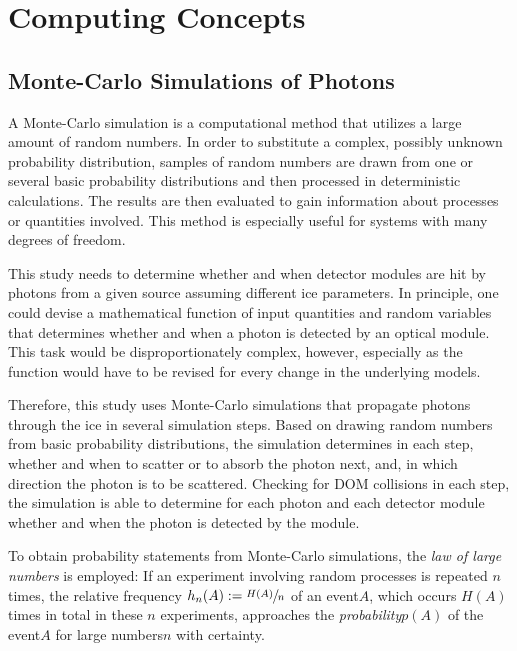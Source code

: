 
\section{Computing Concepts}
\label{sec:simulation_background}

\subsection{Monte-Carlo Simulations of Photons}
\label{sec:monte_carlo}


A Monte-Carlo simulation is a computational method that utilizes a large amount of random numbers.
In order to substitute a complex, possibly unknown probability distribution, samples of random numbers are drawn from one or several basic probability distributions and then processed in deterministic calculations. The results are then evaluated to gain information about processes or quantities involved. This method is especially useful for systems with many degrees of freedom. \cite{physiklexikon}

This study needs to determine whether and when detector modules are hit by photons from a given source assuming different ice parameters. In principle, one could devise a mathematical function of input quantities and random variables that determines whether and when a photon is detected by an optical module. This task would be disproportionately complex, however, especially as the function would have to be revised for every change in the underlying models.

Therefore, this study uses Monte-Carlo simulations that propagate photons through the ice in several simulation steps. Based on drawing random numbers from basic probability distributions, the simulation determines in each step, whether and when to scatter or to absorb the photon next, and, in which direction the photon is to be scattered. Checking for DOM collisions in each step, the simulation is able to determine for each photon and each detector module whether and when the photon is detected by the module.

To obtain probability statements from Monte-Carlo simulations, the \textit{law of large numbers} is employed: If an experiment involving random processes is repeated $n$ times, the relative frequency $h_n(A):=\sfrac{H(A)}{n}$ of an event\nbsp $A$, which occurs $H(A)$ times in total in these $n$ experiments, approaches the \textit{probability}\nbsp $p(A)$ of the event\nbsp $A$ for large numbers\nbsp $n$ with certainty. \cite{physiklexikon}

